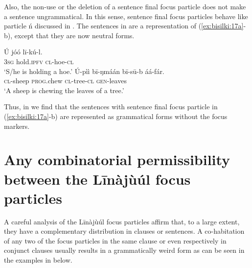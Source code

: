 \documentclass[output=paper,colorlinks,citecolor=brown]{langscibook}
\begin{document}
Also, the non-use or the deletion of a sentence final focus particle does not make a sentence ungrammatical. In this sense, sentence final focus particles behave like particle ń discussed in . The sentences in  are a representation of (\ref{ex:bisilki:17a}-b), except that they are now neutral forms.

\ea%
    \label{ex:bisilki:20}
    \ea\label{ex:bisilki:20a}
    \gll    Ú	jóó		lī-kú-l.\\
            \textsc{3sg}	hold\textsc{.ipfv}	\textsc{cl-}hoe\textsc{-cl}\\
    \glt    ‘S/he is holding a hoe.’
    \ex\label{ex:bisilki:20b}
    \gll    Ú-pìì		bī-ŋmáán	bī-sū-b	áá-fár.\\
            \textsc{cl-}sheep	\textsc{prog.}chew	\textsc{cl-}tree\textsc{-cl}	\textsc{gen-}leaves\\
    \glt    ‘A sheep is chewing the leaves of a tree.’
    \z
\z

Thus, in  we find that the sentences with sentence final focus particle in (\ref{ex:bisilki:17a}-b) are represented as grammatical forms without the focus markers.

\section{Any combinatorial permissibility between the Līnàjùúl focus particles}\label{sec:bisilki:6}

A careful analysis of the Līnàjùúl focus particles affirm that, to a large extent, they have a complementary distribution in clauses or sentences. A co-habitation of any two of the focus particles in the same clause or even respectively in conjunct clauses usually results in a grammatically weird form as can be seen in the examples in  below.

\ea%
    \label{ex:bisilki:21}
    \z
\z
\end{document}
